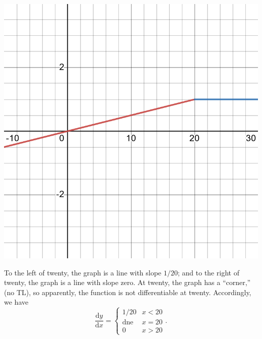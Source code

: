 \documentclass[12pt, answers,fleqn]{exam}
\begin{document}
\begin{questions}
\begin{solution}
    \begin{center}
\includegraphics[scale=0.25]{desmos-graph(35).png}
    \end{center}

To the left of twenty, the graph is a line with slope $1/20$; and
to the right of twenty, the graph is a line with slope zero. At twenty,
the graph has a ``corner,'' (no TL), so apparently, the function is not 
differentiable at twenty. Accordingly, we have
\[
    \frac{\mathrm{d}y}{\mathrm{d}x} =
    \begin{cases} 1/20  & x < 20 \\
                 \mbox{dne} & x = 20 \\
                 0 & x >  20 \end{cases}.
\]
    
\end{solution}


\end{questions}
\end{document}
